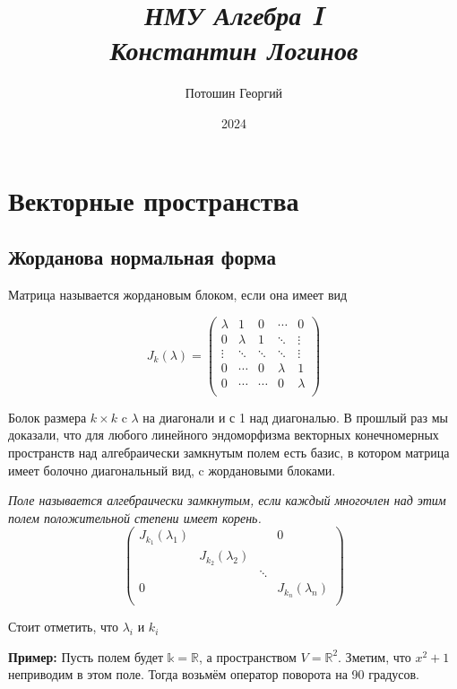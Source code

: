\documentclass[a4paper, 12pt]{book}
\title{
\textit{\huge{НМУ Алгебра I\\Константин Логинов}}
}
\date{2024}
\author{Потошин Георгий}
\begin{document}
\maketitle
\chapter{Векторные пространства}
\section{Жорданова нормальная форма}
Матрица называется жордановым блоком, если она имеет вид

\[J_k(\lambda)=\left(\begin{array}{ccccc}
    \lambda & 1       & 0      & \cdots  & 0\\
    0       & \lambda & 1      & \ddots  & \vdots\\
    \vdots  & \ddots  & \ddots & \ddots  & \vdots\\
    0       & \cdots  & 0      & \lambda & 1\\
    0       & \cdots  & \cdots & 0       & \lambda\\
\end{array}\right)\]

Болок размера $k\times k$ c $\lambda$ на диагонали и с 1 над диагональю. В
прошлый раз мы доказали, что для любого линейного эндоморфизма векторных
конечномерных пространств над алгебраически замкнутым полем есть базис, в
котором матрица имеет болочно диагональный вид, c жордановыми блоками.

\textit{Поле называется алгебраически замкнутым, если каждый многочлен над этим
полем положительной степени имеет корень.}
\[
    \left(\begin{array}{cccc}
        J_{k_1}(\lambda_1) &                    &        & 0\\
                           & J_{k_2}(\lambda_2) &        & \\
                           &                    & \ddots & \\
        0                  &                    &        & J_{k_n}(\lambda_n)\\
    \end{array}\right)
\]

Стоит отметить, что $\lambda_i$ и $k_i$

\textbf{Пример:} Пусть полем будет $\mathbb{k}=\mathbb{R}$, а пространством
$V=\mathbb{R}^2$. Зметим, что $x^2+1$ неприводим в этом поле. Тогда возьмём
оператор поворота на 90 градусов.
\end{document}
